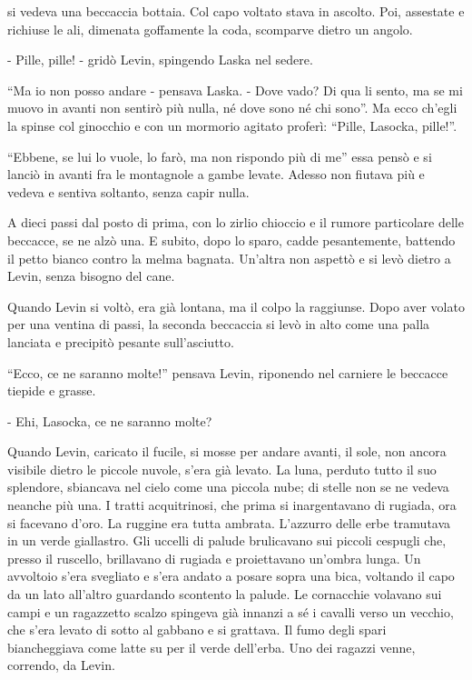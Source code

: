 si vedeva una beccaccia bottaia. Col capo voltato stava in ascolto. Poi, assestate e richiuse le ali, dimenata goffamente la coda, scomparve dietro un angolo. 

- Pille, pille! - gridò Levin, spingendo Laska nel sedere. 

``Ma io non posso andare - pensava Laska. - Dove vado? Di qua li sento, ma se mi muovo in avanti non sentirò più nulla, né dove sono né chi sono''. Ma ecco ch'egli la spinse col ginocchio e con un mormorio agitato proferì: ``Pille, Lasocka, pille!''. 

``Ebbene, se lui lo vuole, lo farò, ma non rispondo più di me'' essa pensò e si lanciò in avanti fra le montagnole a gambe levate. Adesso non fiutava più e vedeva e sentiva soltanto, senza capir nulla. 

A dieci passi dal posto di prima, con lo zirlio chioccio e il rumore particolare delle beccacce, se ne alzò una. E subito, dopo lo sparo, cadde pesantemente, battendo il petto bianco contro la melma bagnata. Un'altra non aspettò e si levò dietro a Levin, senza bisogno del cane. 

Quando Levin si voltò, era già lontana, ma il colpo la raggiunse. Dopo aver volato per una ventina di passi, la seconda beccaccia si levò in alto come una palla lanciata e precipitò pesante sull'asciutto. 

``Ecco, ce ne saranno molte!'' pensava Levin, riponendo nel carniere le beccacce tiepide e grasse. 

- Ehi, Lasocka, ce ne saranno molte? 

Quando Levin, caricato il fucile, si mosse per andare avanti, il sole, non ancora visibile dietro le piccole nuvole, s'era già levato. La luna, perduto tutto il suo splendore, sbiancava nel cielo come una piccola nube; di stelle non se ne vedeva neanche più una. I tratti acquitrinosi, che prima si inargentavano di rugiada, ora si facevano d'oro. La ruggine era tutta ambrata. L'azzurro delle erbe tramutava in un verde giallastro. Gli uccelli di palude brulicavano sui piccoli cespugli che, presso il ruscello, brillavano di rugiada e proiettavano un'ombra lunga. Un avvoltoio s'era svegliato e s'era andato a posare sopra una bica, voltando il capo da un lato all'altro guardando scontento la palude. Le cornacchie volavano sui campi e un ragazzetto scalzo spingeva già innanzi a sé i cavalli verso un vecchio, che s'era levato di sotto al gabbano e si grattava. Il fumo degli spari biancheggiava come latte su per il verde dell'erba. Uno dei ragazzi venne, correndo, da Levin. 


